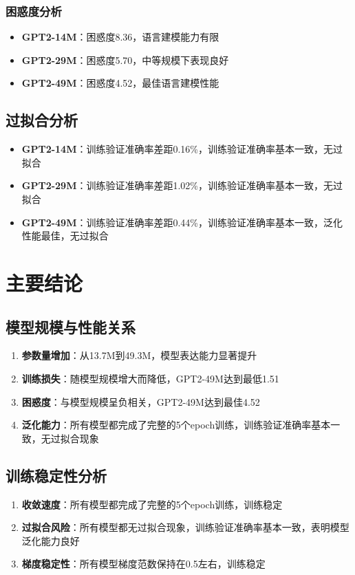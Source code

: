 \documentclass{article}
\begin{document}
\subsubsection{困惑度分析}
\begin{itemize}
    \item \textbf{GPT2-14M}：困惑度8.36，语言建模能力有限
    \item \textbf{GPT2-29M}：困惑度5.70，中等规模下表现良好
    \item \textbf{GPT2-49M}：困惑度4.52，最佳语言建模性能
\end{itemize}

\subsection{过拟合分析}
\begin{itemize}
    \item \textbf{GPT2-14M}：训练验证准确率差距0.16\%，训练验证准确率基本一致，无过拟合
    \item \textbf{GPT2-29M}：训练验证准确率差距1.02\%，训练验证准确率基本一致，无过拟合
    \item \textbf{GPT2-49M}：训练验证准确率差距0.44\%，训练验证准确率基本一致，泛化性能最佳，无过拟合
\end{itemize}

\section{主要结论}

\subsection{模型规模与性能关系}
\begin{enumerate}
    \item \textbf{参数量增加}：从13.7M到49.3M，模型表达能力显著提升
    \item \textbf{训练损失}：随模型规模增大而降低，GPT2-49M达到最低1.51
    \item \textbf{困惑度}：与模型规模呈负相关，GPT2-49M达到最佳4.52
    \item \textbf{泛化能力}：所有模型都完成了完整的5个epoch训练，训练验证准确率基本一致，无过拟合现象
\end{enumerate}

\subsection{训练稳定性分析}
\begin{enumerate}
    \item \textbf{收敛速度}：所有模型都完成了完整的5个epoch训练，训练稳定
    \item \textbf{过拟合风险}：所有模型都无过拟合现象，训练验证准确率基本一致，表明模型泛化能力良好
    \item \textbf{梯度稳定性}：所有模型梯度范数保持在0.5左右，训练稳定
\end{enumerate}
\end{document}
